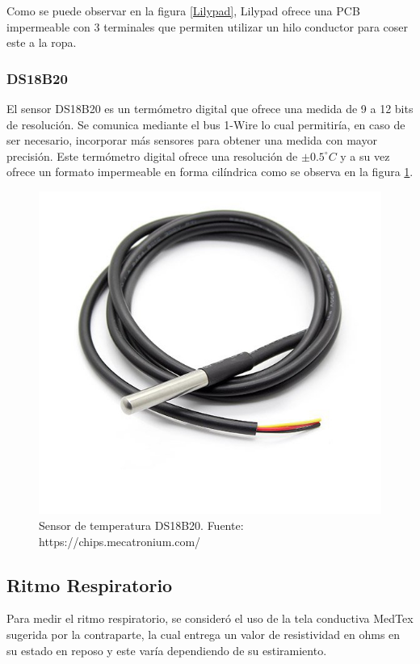 Como se puede observar en la figura \ref{Lilypad}, Lilypad ofrece una PCB impermeable con 3 terminales que permiten utilizar un hilo conductor para coser este a la ropa.

\subsubsection{DS18B20}
El sensor DS18B20\cite{temp} es un termómetro digital que ofrece una medida de 9 a 12 bits de resolución. Se comunica mediante el bus 1-Wire lo cual permitiría, en caso de ser necesario, incorporar más sensores para obtener una medida con mayor precisión. 
Este termómetro digital ofrece una resolución de $\pm0.5^\circ C$ y a su vez ofrece un formato impermeable en forma cilíndrica como se observa en la figura \ref{DS18B20}.

\begin{figure}[H]
	\centering
	\includegraphics[scale=0.2]{figuras/sensor/t/ds18.jpg}
	\caption{Sensor de temperatura DS18B20. Fuente: https://chips.mecatronium.com/}
	\label{DS18B20}
\end{figure}

\subsection{Ritmo Respiratorio}
Para medir el ritmo respiratorio, se consideró el uso de la tela conductiva MedTex sugerida por la contraparte, la cual entrega un valor de resistividad en ohms en su estado en reposo y este varía dependiendo de su estiramiento.\\

